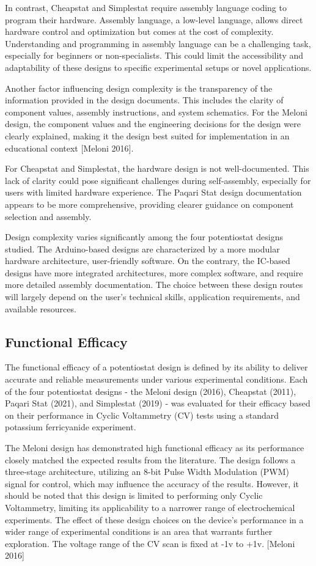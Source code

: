 \documentclass{article}
\begin{document}
In contrast, Cheapstat and Simplestat require assembly language coding to program their hardware. Assembly language, a low-level language, allows direct hardware control and optimization but comes at the cost of complexity. Understanding and programming in assembly language can be a challenging task, especially for beginners or non-specialists. This could limit the accessibility and adaptability of these designs to specific experimental setups or novel applications.

Another factor influencing design complexity is the transparency of the information provided in the design documents. This includes the clarity of component values, assembly instructions, and system schematics. For the Meloni design, the component values and the engineering decisions for the design were clearly explained, making it the design best suited for implementation in an educational context [Meloni 2016].

For Cheapstat and Simplestat, the hardware design is not well-documented. This lack of clarity could pose significant challenges during self-assembly, especially for users with limited hardware experience. The Paqari Stat design documentation appears to be more comprehensive, providing clearer guidance on component selection and assembly.

Design complexity varies significantly among the four potentiostat designs studied. The Arduino-based designs are characterized by a more modular hardware architecture, user-friendly software. On the contrary, the IC-based designs have more integrated architectures, more complex software, and require more detailed assembly documentation. The choice between these design routes will largely depend on the user's technical skills, application requirements, and available resources.

\subsection*{Functional Efficacy}
The functional efficacy of a potentiostat design is defined by its ability to deliver accurate and reliable measurements under various experimental conditions. Each of the four potentiostat designs - the Meloni design (2016), Cheapstat (2011), Paqari Stat (2021), and Simplestat (2019) - was evaluated for their efficacy based on their performance in Cyclic Voltammetry (CV) tests using a standard potassium ferricyanide experiment.

The Meloni design has demonstrated high functional efficacy as its performance closely matched the expected results from the literature. The design follows a three-stage architecture, utilizing an 8-bit Pulse Width Modulation (PWM) signal for control, which may influence the accuracy of the results. However, it should be noted that this design is limited to performing only Cyclic Voltammetry, limiting its applicability to a narrower range of electrochemical experiments. The effect of these design choices on the device's performance in a wider range of experimental conditions is an area that warrants further exploration. The voltage range of the CV scan is fixed at -1v to +1v. [Meloni 2016]
\end{document}
